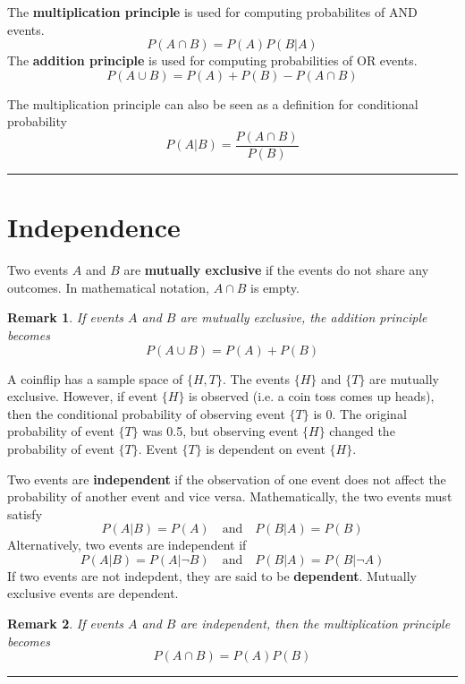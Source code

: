 \documentclass{article}
\newtheorem*{remark}{Remark}
\theoremstyle{definition}
\newcommand{\secend}[0]{\noindent\rule[0.5ex]{\linewidth}{1pt}}
\newcommand{\set}[1]{\{#1\}}
\newcommand{\mand}[0]{\quad\text{and}\quad}
\begin{document}
\begin{definition}
    The \textbf{multiplication principle} is used for computing probabilites of
    AND events.
    \[
        P(A \cap B) = P(A)P(B|A)
    \]
    The \textbf{addition principle} is used for computing probabilities of OR
    events.
    \[
        P(A \cup B) = P(A)+P(B) - P(A \cap B)
    \]
\end{definition}

\noindent The multiplication principle can also be seen as a definition for
conditional probability
\[
    P(A|B) = \frac{P(A\cap B)}{P(B)}
\]
\secend

\section*{Independence}
\begin{definition}
    Two events $A$ and $B$ are \textbf{mutually exclusive} if the events do not
    share any outcomes. In mathematical notation, $A \cap B$ is empty.
\end{definition}

\begin{remark}
    If events $A$ and $B$ are mutually exclusive, the addition principle becomes
    \[
        P(A \cup B) = P(A)+P(B)
    \]
\end{remark}

\noindent A coinflip has a sample space of $\set{H,T}$. The events $\set{H}$ and
$\set{T}$ are mutually exclusive. However, if event $\set{H}$ is observed (i.e.
a coin toss comes up heads), then the conditional probability of observing event
$\set{T}$ is 0. The original probability of event $\set{T}$ was 0.5, but
observing event $\set{H}$ changed the probability of event $\set{T}$. Event
$\set{T}$ is dependent on event $\set{H}$.

\begin{definition}
    Two events are \textbf{independent} if the observation of one event does not
    affect the probability of another event and vice versa. Mathematically, the
    two events must satisfy
    \[
        P(A|B) = P(A) \mand P(B|A) = P(B)
    \]
    Alternatively, two events are independent if 
    \[
        P(A|B) = P(A|\neg B) \mand P(B|A) = P(B|\neg A)
    \]
    \tcblower
    If two events are not indepdent, they are said to be \textbf{dependent}.
    Mutually exclusive events are dependent.
\end{definition}

\begin{remark}
    If events $A$ and $B$ are independent, then the multiplication principle
    becomes
    \[
        P(A \cap B) = P(A)P(B) 
    \]
\end{remark}
\secend
\end{document}
